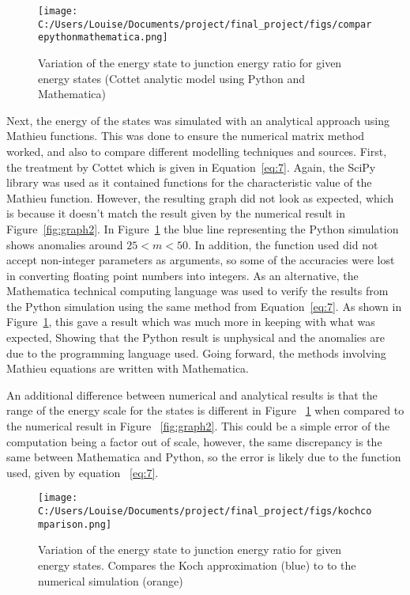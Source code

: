 \documentclass[11pt]{article}
\begin{document}
\begin{figure}[ht]
\centering
\texttt{[image: C:/Users/Louise/Documents/project/final\_project/figs/comparepythonmathematica.png]}
\caption{Variation of the  energy state to junction energy ratio for given energy states (Cottet analytic model using Python and Mathematica)}
\label{fig:graph3}
\end{figure}
Next, the energy of the states was simulated with an analytical approach using Mathieu functions. This was done to ensure the numerical matrix method worked, and also to compare different modelling techniques and sources. First, the treatment by Cottet which is given in Equation~\ref{eq:7}. Again, the SciPy library was used as it contained functions for the characteristic value of the Mathieu function. However, the resulting graph did not look as expected, which is because it doesn't match the result given by the numerical result in Figure~\ref{fig:graph2}. In Figure~\ref{fig:graph3} the blue line representing the Python simulation shows anomalies around $25 < m < 50$. In addition, the function used did not accept non-integer parameters as arguments, so some of the accuracies were lost in converting floating point numbers into integers. As an alternative, the Mathematica technical computing language was used to verify the results from the Python simulation using the same method from Equation~\ref{eq:7}. As shown in Figure~\ref{fig:graph3}, this gave a result which was much more in keeping with what was expected, Showing that the Python result is unphysical and the anomalies are due to the programming language used. Going forward, the methods involving Mathieu equations are written with Mathematica.


An additional difference between numerical and analytical results is that the range of the energy scale for the states is different in Figure ~\ref{fig:graph3} when compared to the numerical result in Figure ~\ref{fig:graph2}. This could be a simple error of the computation being a factor out of scale, however, the same discrepancy is the same between Mathematica and Python, so the error is likely due to the function used, given by equation ~\ref{eq:7}.
\begin{figure}[ht]
\centering
\texttt{[image: C:/Users/Louise/Documents/project/final\_project/figs/kochcomparison.png]}
\caption{Variation of the  energy state to junction energy ratio for given energy states. Compares the Koch approximation (blue) to to the numerical simulation (orange)}
\label{fig:graph4}
\end{figure}
\end{document}
